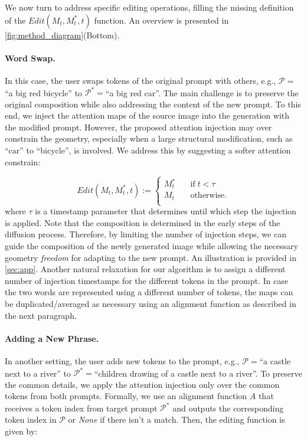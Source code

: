 We now turn to address specific editing operations, filling the missing definition of the $Edit(M_{t}, M_{t}^*, t)$ function. An overview is presented in \ref{fig:method_diagram}(Bottom).

\paragraph{Word Swap.} In this case, the user swaps tokens of the original prompt with others, e.g., $\mathcal{P}=$``a big red bicycle'' to $\mathcal{P}^*=$``a big red car''. The main challenge is to preserve the original composition while also addressing the content of the new prompt. To this end, we inject the attention maps of the source image into the generation with the modified prompt. However, the proposed attention injection may over constrain the geometry, especially when a large structural modification, such as ``car'' to ``bicycle'', is involved. We address this by suggesting a softer attention constrain:

$$ Edit(M_{t}, M_{t}^*, t) :=

\begin{cases}
       M_{t}^* &\quad\text{if} \; t < \tau\\
       M_{t} &\quad\text{otherwise.} \\ 
     \end{cases}

$$
     where $\tau$ is a timestamp parameter that determines until which step the injection is applied. Note that the composition is determined in the early steps of the diffusion process. Therefore, by limiting the number of injection steps, we can guide the composition of the newly generated image while allowing the necessary geometry \textit{freedom} for adapting to the new prompt. An illustration is provided in \ref{sec:app}. Another natural relaxation for our algorithm is to assign a different number of injection timestamps for the different tokens in the prompt. In case the two words are represented using a different number of tokens, the maps can be duplicated/averaged as necessary using an alignment function as described in the next paragraph.

\paragraph{Adding a New Phrase.} In another setting, the user adds new tokens to the prompt, e.g., $\mathcal{P}=$``a castle next to a river'' to $\mathcal{P}^*=$``children drawing of a castle next to a river''. To preserve the common details, we apply the attention injection only over the common tokens from both prompts. Formally, we use an alignment function $A$ that receives a token index from target prompt $\mathcal{P}^*$ and outputs the corresponding token index in $\mathcal{P}$ or \textit{None} if there isn't a match. Then, the editing function is given by:


